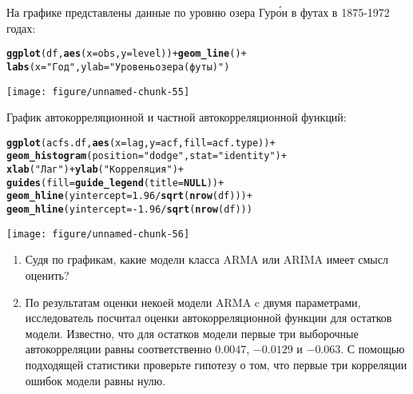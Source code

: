 \documentclass[pdftex,11pt,openany]{book}\usepackage[]{graphicx}\usepackage[]{color}
\makeatletter
\newcommand{\hlnum}[1]{\textcolor[rgb]{0.686,0.059,0.569}{#1}}%
\newcommand{\hlstr}[1]{\textcolor[rgb]{0.192,0.494,0.8}{#1}}%
\newcommand{\hlopt}[1]{\textcolor[rgb]{0,0,0}{#1}}%
\newcommand{\hlstd}[1]{\textcolor[rgb]{0.345,0.345,0.345}{#1}}%
\newcommand{\hlkwa}[1]{\textcolor[rgb]{0.161,0.373,0.58}{\textbf{#1}}}%
\newcommand{\hlkwc}[1]{\textcolor[rgb]{0.333,0.667,0.333}{#1}}%
\newcommand{\hlkwd}[1]{\textcolor[rgb]{0.737,0.353,0.396}{\textbf{#1}}}%
\newenvironment{kframe}{%
 \def\at@end@of@kframe{}%
 \ifinner\ifhmode%
  \def\at@end@of@kframe{\end{minipage}}%
  \begin{minipage}{\columnwidth}%
 \fi\fi%
 \def\FrameCommand##1{\hskip\@totalleftmargin \hskip-\fboxsep
 \colorbox{shadecolor}{##1}\hskip-\fboxsep
     \hskip-\linewidth \hskip-\@totalleftmargin \hskip\columnwidth}%
 \MakeFramed {\advance\hsize-\width
   \@totalleftmargin\z@ \linewidth\hsize
   \@setminipage}}%
 {\par\unskip\endMakeFramed%
 \at@end@of@kframe}
\newenvironment{knitrout}{}{} %
\makeatother
\begin{document}
\begin{problem}
На графике представлены данные по уровню озера Гур\'{о}н в футах в 1875-1972 годах:  



\begin{knitrout}
\color{fgcolor}\begin{kframe}
\begin{alltt}
\hlkwd{ggplot}\hlstd{(df,}\hlkwd{aes}\hlstd{(}\hlkwc{x}\hlstd{=obs,}\hlkwc{y}\hlstd{=level))}\hlopt{+}\hlkwd{geom_line}\hlstd{()}\hlopt{+}
    \hlkwd{labs}\hlstd{(}\hlkwc{x}\hlstd{=}\hlstr{"Год"}\hlstd{,}\hlkwc{ylab}\hlstd{=}\hlstr{"Уровень озера (футы)"}\hlstd{)}
\end{alltt}
\end{kframe}
\texttt{[image: figure/unnamed-chunk-55]} 

\end{knitrout}

График автокорреляционной и частной автокорреляционной функций:

\begin{knitrout}
\color{fgcolor}\begin{kframe}
\begin{alltt}
\hlkwd{ggplot}\hlstd{(acfs.df,}\hlkwd{aes}\hlstd{(}\hlkwc{x}\hlstd{=lag,}\hlkwc{y}\hlstd{=acf,}\hlkwc{fill}\hlstd{=acf.type))}\hlopt{+}
    \hlkwd{geom_histogram}\hlstd{(}\hlkwc{position}\hlstd{=}\hlstr{"dodge"}\hlstd{,}\hlkwc{stat}\hlstd{=}\hlstr{"identity"}\hlstd{)}\hlopt{+}
  \hlkwd{xlab}\hlstd{(}\hlstr{"Лаг"}\hlstd{)}\hlopt{+}\hlkwd{ylab}\hlstd{(}\hlstr{"Корреляция"}\hlstd{)} \hlopt{+}
  \hlkwd{guides}\hlstd{(}\hlkwc{fill}\hlstd{=}\hlkwd{guide_legend}\hlstd{(}\hlkwc{title}\hlstd{=}\hlkwa{NULL}\hlstd{))}\hlopt{+}
  \hlkwd{geom_hline}\hlstd{(}\hlkwc{yintercept}\hlstd{=}\hlnum{1.96}\hlopt{/}\hlkwd{sqrt}\hlstd{(}\hlkwd{nrow}\hlstd{(df)))}\hlopt{+}
  \hlkwd{geom_hline}\hlstd{(}\hlkwc{yintercept}\hlstd{=}\hlopt{-}\hlnum{1.96}\hlopt{/}\hlkwd{sqrt}\hlstd{(}\hlkwd{nrow}\hlstd{(df)))}
\end{alltt}
\end{kframe}
\texttt{[image: figure/unnamed-chunk-56]} 

\end{knitrout}


\begin{enumerate}
\item Судя по графикам, какие модели класса ARMA или ARIMA имеет смысл оценить?
\item По результатам оценки некоей модели ARMA c двумя параметрами, исследователь посчитал оценки автокорреляционной функции для остатков модели. Известно, что для остатков модели первые три выборочные автокорреляции равны соответственно $0.0047$, $\ensuremath{-0.0129}$ и $\ensuremath{-0.063}$. С помощью подходящей статистики проверьте гипотезу о том, что первые три корреляции ошибок модели равны нулю.
\end{enumerate}
\end{problem}
\end{document}
